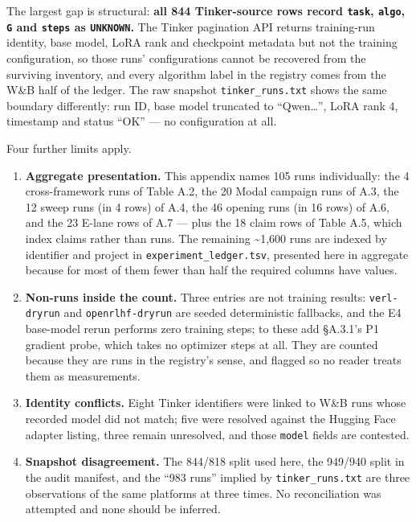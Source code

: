 \documentclass[12pt,a4paper]{report}
\begin{document}
The largest gap is structural: \textbf{all 844 Tinker-source rows record
\texttt{task}, \texttt{algo}, \texttt{G} and \texttt{steps} as
\texttt{UNKNOWN}.} The Tinker pagination API returns training-run
identity, base model, LoRA rank and checkpoint metadata but not the
training configuration, so those runs' configurations cannot be
recovered from the surviving inventory, and every algorithm label in the
registry comes from the W\&B half of the ledger. The raw snapshot
\texttt{tinker\_runs.txt} shows the same boundary differently: run ID,
base model truncated to ``Qwen\ldots{}'', LoRA rank 4, timestamp and
status ``OK'' --- no configuration at all.

Four further limits apply.

\begin{enumerate}
\def\labelenumi{\arabic{enumi}.}
\item
  \textbf{Aggregate presentation.} This appendix names 105 runs
  individually: the 4 cross-framework runs of Table A.2, the 20 Modal
  campaign runs of A.3, the 12 sweep runs (in 4 rows) of A.4, the 46
  opening runs (in 16 rows) of A.6, and the 23 E-lane rows of A.7 ---
  plus the 18 claim rows of Table A.5, which index claims rather than
  runs. The remaining \textasciitilde1,600 runs are indexed by
  identifier and project in \texttt{experiment\_ledger.tsv}, presented
  here in aggregate because for most of them fewer than half the
  required columns have values.
\item
  \textbf{Non-runs inside the count.} Three entries are not training
  results: \texttt{verl-dryrun} and \texttt{openrlhf-dryrun} are seeded
  deterministic fallbacks, and the E4 base-model rerun performs zero
  training steps; to these add §A.3.1's P1 gradient probe, which takes
  no optimizer steps at all. They are counted because they are runs in
  the registry's sense, and flagged so no reader treats them as
  measurements.
\item
  \textbf{Identity conflicts.} Eight Tinker identifiers were linked to
  W\&B runs whose recorded model did not match; five were resolved
  against the Hugging Face adapter listing, three remain unresolved, and
  those \texttt{model} fields are contested.
\item
  \textbf{Snapshot disagreement.} The 844/818 split used here, the
  949/940 split in the audit manifest, and the ``983 runs'' implied by
  \texttt{tinker\_runs.txt} are three observations of the same platforms
  at three times. No reconciliation was attempted and none should be
  inferred.
\end{enumerate}
\end{document}

